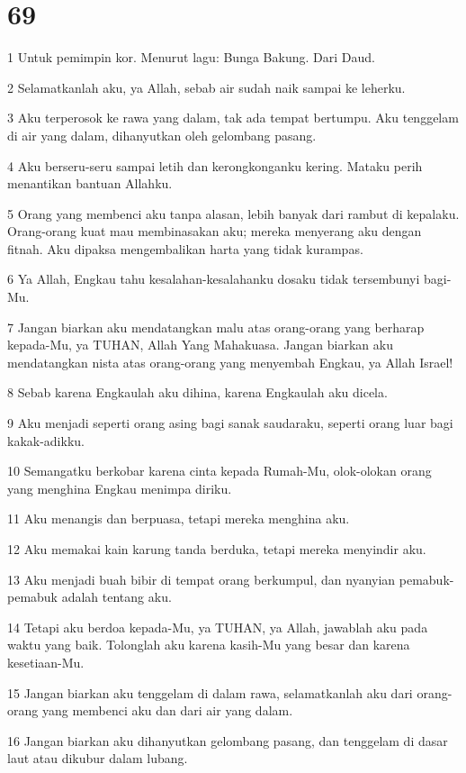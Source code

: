\chapter{69}

\par 1 Untuk pemimpin kor. Menurut lagu: Bunga Bakung. Dari Daud.
\par 2 Selamatkanlah aku, ya Allah, sebab air sudah naik sampai ke leherku.
\par 3 Aku terperosok ke rawa yang dalam, tak ada tempat bertumpu. Aku tenggelam di air yang dalam, dihanyutkan oleh gelombang pasang.
\par 4 Aku berseru-seru sampai letih dan kerongkonganku kering. Mataku perih menantikan bantuan Allahku.
\par 5 Orang yang membenci aku tanpa alasan, lebih banyak dari rambut di kepalaku. Orang-orang kuat mau membinasakan aku; mereka menyerang aku dengan fitnah. Aku dipaksa mengembalikan harta yang tidak kurampas.
\par 6 Ya Allah, Engkau tahu kesalahan-kesalahanku dosaku tidak tersembunyi bagi-Mu.
\par 7 Jangan biarkan aku mendatangkan malu atas orang-orang yang berharap kepada-Mu, ya TUHAN, Allah Yang Mahakuasa. Jangan biarkan aku mendatangkan nista atas orang-orang yang menyembah Engkau, ya Allah Israel!
\par 8 Sebab karena Engkaulah aku dihina, karena Engkaulah aku dicela.
\par 9 Aku menjadi seperti orang asing bagi sanak saudaraku, seperti orang luar bagi kakak-adikku.
\par 10 Semangatku berkobar karena cinta kepada Rumah-Mu, olok-olokan orang yang menghina Engkau menimpa diriku.
\par 11 Aku menangis dan berpuasa, tetapi mereka menghina aku.
\par 12 Aku memakai kain karung tanda berduka, tetapi mereka menyindir aku.
\par 13 Aku menjadi buah bibir di tempat orang berkumpul, dan nyanyian pemabuk-pemabuk adalah tentang aku.
\par 14 Tetapi aku berdoa kepada-Mu, ya TUHAN, ya Allah, jawablah aku pada waktu yang baik. Tolonglah aku karena kasih-Mu yang besar dan karena kesetiaan-Mu.
\par 15 Jangan biarkan aku tenggelam di dalam rawa, selamatkanlah aku dari orang-orang yang membenci aku dan dari air yang dalam.
\par 16 Jangan biarkan aku dihanyutkan gelombang pasang, dan tenggelam di dasar laut atau dikubur dalam lubang.
